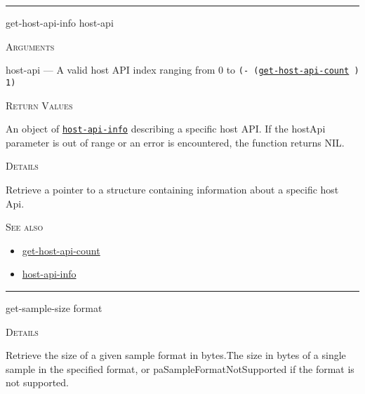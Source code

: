 \documentclass[a4paper]{report}
\begin{document}
  

    \rule{\linewidth}{0.1mm}
    
    \label{portaudio__fun__get-host-api-info}
    \begin{defun}[Function]
    get-host-api-info host-api


    
    \bigskip
    \textsc{Arguments}

host-api
	--- A valid host API index ranging from 0 to \texttt{(- (\hyperref[portaudio__fun__get-host-api-count]{\texttt{get-host-api-count}}
  ) 1)}




    
    \bigskip
    \textsc{Return Values}

An object of \hyperref[portaudio__class__host-api-info]{\texttt{host-api-info}}
   describing a specific host API. If the hostApi parameter is out of range or an error is encountered, the function returns NIL.


	
    \bigskip
    \textsc{Details}

Retrieve a pointer to a structure containing information about a specific host Api.






      
    \bigskip
    \textsc{See also}


	
    \begin{itemize}
    
	  
    \item
    \hyperref[portaudio__fun__get-host-api-count]{get-host-api-count}
    
    \item
    \hyperref[portaudio__class__host-api-info]{host-api-info}
    
	
    \end{itemize}
  
      


    
    \end{defun}
  
  

    \rule{\linewidth}{0.1mm}
    
    \label{portaudio__fun__get-sample-size}
    \begin{defun}[Function]
    get-sample-size format


	
    \bigskip
    \textsc{Details}

Retrieve the size of a given sample format in bytes.The size in bytes of a single sample in the specified format, or paSampleFormatNotSupported if the format is not supported.


    
    \end{defun}
  
\end{document}
